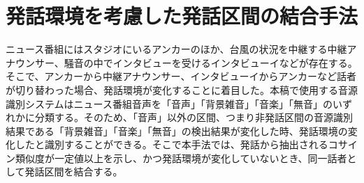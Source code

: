 \section{発話環境を考慮した発話区間の結合手法}
\label{prob2}
ニュース番組にはスタジオにいるアンカーのほか、台風の状況を中継する中継アナウンサー、騒音の中でインタビューを受けるインタビューイなどが存在する。そこで、アンカーから中継アナウンサー、インタビューイからアンカーなど話者が切り替わった場合、発話環境が変化することに着目した。本稿で使用する音源識別システムはニュース番組音声を「音声」「背景雑音」「音楽」「無音」のいずれかに分類する。そのため、「音声」以外の区間、つまり非発話区間の音源識別結果である「背景雑音」「音楽」「無音」の検出結果が変化した時、発話環境の変化したと識別することができる。そこで本手法では、発話から抽出されるコサイン類似度が一定値以上を示し、かつ発話環境が変化していないとき、同一話者として発話区間を結合する。\par
